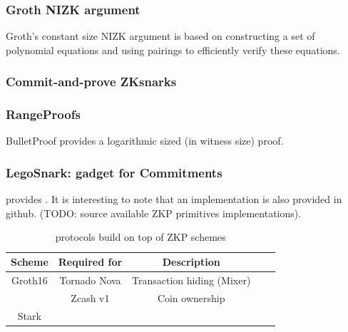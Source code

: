 \documentclass[11pt]{llncs2e/llncs}
\begin{document}
\subsubsection{Groth NIZK argument}
Groth’s constant size NIZK argument is based on constructing a set of polynomial equations and using pairings to efficiently verify these equations.

\subsubsection{Commit-and-prove ZKsnarks}

\subsubsection{RangeProofs}
BulletProof \cite{BulletProof} provides a logarithmic sized (in witness size) proof.

\subsubsection{LegoSnark: gadget for Commitments}

\cite{LegoSnark} provides . It is interesting to note that an implementation is also provided in github. (TODO: source available ZKP primitives implementations).
 
\begin{table}
\begin{center}
 \begin{tabular}{ |c| c|c|c|c|}
  \hline
  Scheme & Required for & Description \\
  \hline\hline
  Groth16  & Tornado Nova & Transaction hiding (Mixer)\\
           & Zcash v1& Coin ownership\\
  \hline
  Stark && \\
  \hline
  
  \hline
  
 \end{tabular}
 \end{center}
 \caption{protocols build on top of ZKP schemes}
 \label{tab-usecommit}
\end{table}
 
\end{document}
